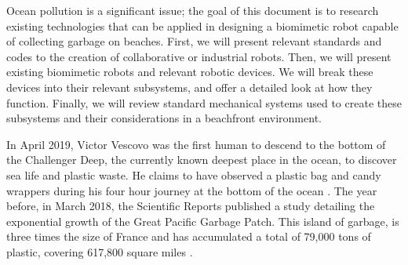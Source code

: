 Ocean pollution is a significant issue; the goal of this document is to research existing technologies that can be applied in designing a biomimetic robot capable of collecting garbage on beaches.
First, we will present relevant standards and codes to the creation of collaborative or industrial robots.
Then, we will present existing biomimetic robots and relevant robotic devices.
We will break these devices into their relevant subsystems, and offer a detailed look at how they function.
Finally, we will review standard mechanical systems used to create these subsystems and their considerations in a beachfront environment.

In April 2019, Victor Vescovo was the first human to descend to the bottom of the Challenger Deep, the currently known deepest place in the ocean, to discover sea life and plastic waste. 
He claims to have observed a plastic bag and candy wrappers during his four hour journey at the bottom of the ocean \cite{street_deepest_2019}.
The year before, in March 2018, the Scientific Reports published a study detailing the exponential growth of the Great Pacific Garbage Patch.
This island of garbage, is three times the size of France and has accumulated a total of 79,000 tons of plastic, covering 617,800 square miles \cite{abc_great_2018}.